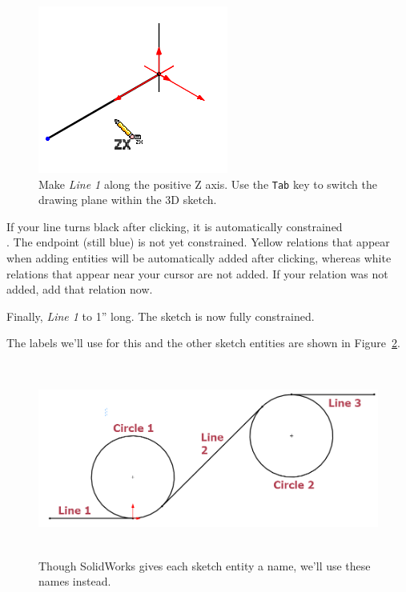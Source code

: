 \begin{figure}[H]
\begin{center}
\includegraphics{images/figures/Making-Line-1.png}
\end{center}
\caption{Make \emph{Line 1} along the positive Z axis. Use the \texttt{Tab} key to switch the drawing plane within the 3D sketch. \label{fig:making-line-1}}
\end{figure}

If your line turns black after clicking, it is automatically constrained
\\ . The endpoint (still blue) is not yet constrained. Yellow relations that appear when adding entities will be automatically added after
clicking, whereas white relations that appear near your cursor are not added. If your relation was not added, add that relation now.

Finally,  \emph{Line 1} to 1'' long. The sketch is now fully constrained.

The labels we'll use for this and the other sketch entities are shown in
Figure~\ref{fig:labeled-sketch}.

\begin{figure}[H]
\begin{center}
\includegraphics[height=2.5in]{images/figures/labeled-sketch.png}
\end{center}
\caption{Though SolidWorks gives each sketch entity a name, we'll use these
names instead. \label{fig:labeled-sketch}}
\end{figure}


